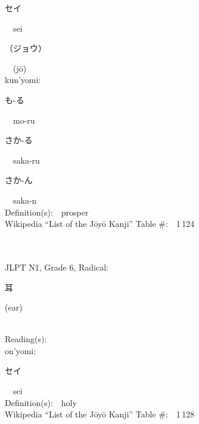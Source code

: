 \begin{multicols}{2}
{\hspace*{2em}}{\begin{CJK}{UTF8}{min} セイ \end{CJK}}\ \ sei\ \ \\
{\hspace*{2em}}{\begin{CJK}{UTF8}{min} （ジョウ） \end{CJK}}\ \ (j\=o)\ \ \\
{\hspace*{1em}}kun'yomi:\ \ \\
{\hspace*{2em}}{\begin{CJK}{UTF8}{min} も-る \end{CJK}}\ \ mo-ru\ \ \\
{\hspace*{2em}}{\begin{CJK}{UTF8}{min} さか-る \end{CJK}}\ \ saka-ru\ \ \\
{\hspace*{2em}}{\begin{CJK}{UTF8}{min} さか-ん \end{CJK}}\ \ saka-n\ \ \\
Definition(s):\ \ prosper \\
Wikipedia ``List of the J\=oy\=o Kanji'' Table \#:\ \ 1\,124 \\
\ \ \\
{\fontsize{34pt}{40pt}  }\ \ \\  %
{JLPT N1, Grade 6, Radical:\ \ {\begin{CJK}{UTF8}{min} 耳 \end{CJK}} (ear) } \\
Reading(s):\ \ \\
{\hspace*{1em}}on'yomi:\ \ \\
{\hspace*{2em}}{\begin{CJK}{UTF8}{min} セイ \end{CJK}}\ \ sei\ \ \\
Definition(s):\ \ holy \\
Wikipedia ``List of the J\=oy\=o Kanji'' Table \#:\ \ 1\,128 \\
\ \ \\
{\fontsize{34pt}{40pt}  }\ \ \\  %

\end{multicols}
